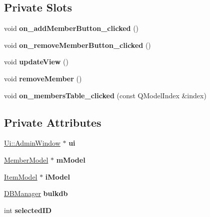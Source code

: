 \subsection*{Private Slots}
\begin{DoxyCompactItemize}
\item 
\mbox{\label{class_admin_window_a997a485ed7faa9841581187ad14288ea}} 
void {\bfseries on\+\_\+add\+Member\+Button\+\_\+clicked} ()
\item 
\mbox{\label{class_admin_window_a8c3cf24ae2f2e441639b8f2a3b318a19}} 
void {\bfseries on\+\_\+remove\+Member\+Button\+\_\+clicked} ()
\item 
\mbox{\label{class_admin_window_a0dc5f886f2767ba3d17da0113168fa3b}} 
void {\bfseries update\+View} ()
\item 
\mbox{\label{class_admin_window_ac723fe967e1c49191addbea8ce544f9a}} 
void {\bfseries remove\+Member} ()
\item 
\mbox{\label{class_admin_window_ae8dd3cfbbbb415ddc4500ed32a752a50}} 
void {\bfseries on\+\_\+members\+Table\+\_\+clicked} (const Q\+Model\+Index \&index)
\end{DoxyCompactItemize}
\subsection*{Private Attributes}
\begin{DoxyCompactItemize}
\item 
\mbox{\label{class_admin_window_a3fa27571cf4952084a71a6fdc9b070b2}} 
\mbox{\hyperlink{class_ui_1_1_admin_window}{Ui\+::\+Admin\+Window}} $\ast$ {\bfseries ui}
\item 
\mbox{\label{class_admin_window_aa5a6a48c6da316befcb677ef4a372d17}} 
\mbox{\hyperlink{class_member_model}{Member\+Model}} $\ast$ {\bfseries m\+Model}
\item 
\mbox{\label{class_admin_window_adac3343d645364a16cf8a970a3e8b12a}} 
\mbox{\hyperlink{class_item_model}{Item\+Model}} $\ast$ {\bfseries i\+Model}
\item 
\mbox{\label{class_admin_window_a5d706087ad7f29389a98d0b732794819}} 
\mbox{\hyperlink{class_d_b_manager}{D\+B\+Manager}} {\bfseries bulkdb}
\item 
\mbox{\label{class_admin_window_a019852d3390ef26cb634709e41f59764}} 
int {\bfseries selected\+ID}
\end{DoxyCompactItemize}


